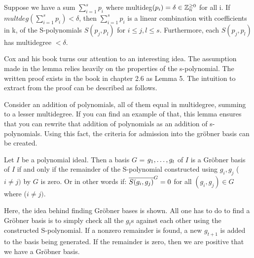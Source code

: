 \newcommand{\generalSum}[4]{\sum_{#1=#2}^#3 #4}
\newcommand{\sPolySum}{\generalSum{i}{1}{s}{p_i}}
\newcommand{\multDeg}[1]{multdeg(#1)}
\newcommand{\spolyFunction}[3]{S(#1_#2, #1_#3)}
\begin{lemma}
    Suppose we have a sum $\sPolySum$ where multideg$(p_i) = \delta \in \mathbb{Z}_{n}^{\geq 0}$ for all i. If $\multDeg{\sPolySum} < \delta$, then $\sPolySum$ is a linear combination with coefficients in k, of the S-polynomials $S(p_j, p_l)$ for $i \leq j, l\leq s$. Furthermore, each $S(p_j, p_l)$ has multidegree $<\delta$.
    \label{lemma:5}
\end{lemma}

Cox and his book \cite{Theory} turns our attention to an interesting idea. The assumption made in the lemma relies heavily on the properties of the s-polynomial. The written proof exists in the book in chapter 2.6 as Lemma 5. The intuition to extract from the proof can be described as follows. 

Consider an addition of polynomials, all of them equal in multidegree, summing to a lesser multidegree. If you can find an example of that, this lemma ensures that you can rewrite that addition of polynomials as an addition of s-polynomials. Using this fact, the criteria for admission into the gröbner basis can be created. 

\begin{theorem}
    Let $I$ be a polynomial ideal. Then a basis $G$ = ${g_1, \dots, g_t}$ of $I$ is a Gröbner basis of $I$ if and only if the remainder of the S-polynomial constructed using $g_i,g_j$ ($i \neq j)$ by $G$ is zero. Or in other words if: $\sPoly{\spolyFunction{g}{i}{j}}{G} = 0$ for all $(g_i,g_j) \in G$ where ($i \neq j)$.
    \label{thm:BuchbergersCriterion}
\end{theorem}

Here, the idea behind finding Gröbner bases is shown. All one has to do to find a Gröbner basis is to simply check all the $g_t$s against each other using the constructed S-polynomial. If a nonzero remainder is found, a new $g_{t+1}$ is added to the basis being generated. If the remainder is zero, then we are positive that we have a Gröbner basis.

